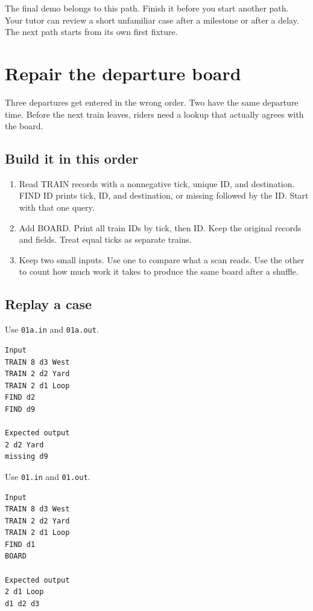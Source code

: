 \documentclass[11pt,letterpaper]{article}
\begin{document}
The final demo belongs to this path. Finish it before you start another path. Your tutor can review a short unfamiliar case after a milestone or after a delay. The next path starts from its own first fixture.

\clearpage

\section{Repair the departure board}\label{trains:01}

Three departures get entered in the wrong order. Two have the same departure time. Before the next train leaves, riders need a lookup that actually agrees with the board.

\subsection*{Build it in this order}

\begin{enumerate}
\item Read TRAIN records with a nonnegative tick, unique ID, and destination. FIND ID prints tick, ID, and destination, or missing followed by the ID. Start with that one query.
\item Add BOARD. Print all train IDs by tick, then ID. Keep the original records and fields. Treat equal ticks as separate trains.
\item Keep two small inputs. Use one to compare what a scan reads. Use the other to count how much work it takes to produce the same board after a shuffle.
\end{enumerate}

\subsection*{Replay a case}

Use \texttt{01a.in} and \texttt{01a.out}.

\begin{samepage}
\small
\begin{verbatim}
Input
TRAIN 8 d3 West
TRAIN 2 d2 Yard
TRAIN 2 d1 Loop
FIND d2
FIND d9

Expected output
2 d2 Yard
missing d9
\end{verbatim}
\end{samepage}

Use \texttt{01.in} and \texttt{01.out}.

\begin{samepage}
\small
\begin{verbatim}
Input
TRAIN 8 d3 West
TRAIN 2 d2 Yard
TRAIN 2 d1 Loop
FIND d1
BOARD

Expected output
2 d1 Loop
d1 d2 d3
\end{verbatim}
\end{samepage}
\end{document}
